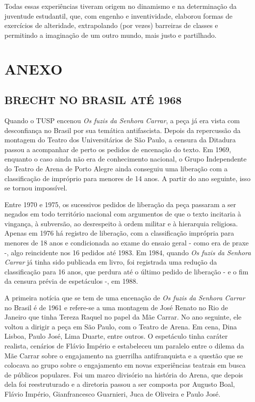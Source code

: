 Todas essas experiências tiveram origem no dinamismo e na determinação
da juventude estudantil, que, com engenho e inventividade, elaborou
formas de exercícios de alteridade, extrapolando (por vezes) barreiras
de classes e permitindo a imaginação de um outro mundo, mais justo e
partilhado.

\chapter{ANEXO}

\section{BRECHT NO BRASIL ATÉ 1968}

Quando o TUSP encenou \textit{Os fuzis da Senhora Carrar}, a peça já era
vista com desconfiança no Brasil por sua temática antifascista. Depois
da repercussão da montagem do Teatro dos Universitários de São Paulo, a
censura da Ditadura passou a acompanhar de perto os pedidos de encenação
do texto. Em 1969, enquanto o caso ainda não era de conhecimento
nacional, o Grupo Independente do Teatro de Arena de Porto Alegre ainda
conseguiu uma liberação com a classificação de impróprio para menores de
14 anos. A partir do ano seguinte, isso se tornou impossível.

Entre 1970 e 1975, os sucessivos pedidos de liberação da peça passaram a
ser negados em todo território nacional com argumentos de que o texto
incitaria à vingança, à subversão, ao desrespeito à ordem militar e à
hierarquia religiosa. Apenas em 1976 há registro de liberação, com a
classificação imprópria para menores de 18 anos e condicionada ao exame
do ensaio geral - como era de praxe -, algo reincidente nos 16 pedidos
até 1983. Em 1984, quando \textit{Os fuzis da Senhora Carrar} já tinha sido
publicada em livro, foi registrada uma redução da classificação para 16
anos, que perdura até o último pedido de liberação - e o fim da censura
prévia de espetáculos -, em 1988.

A primeira notícia que se tem de uma encenação de \textit{Os fuzis da
Senhora Carrar} no Brasil é de 1961 e refere-se a uma montagem de José
Renato no Rio de Janeiro que tinha Tereza Raquel no papel da Mãe Carrar.
No ano seguinte, ele voltou a dirigir a peça em São Paulo, com o Teatro
de Arena. Em cena, Dina Lisboa, Paulo José, Lima Duarte, entre outros. O
espetáculo tinha caráter realista, cenários de Flávio Império e
estabeleceu um paralelo entre o dilema da Mãe Carrar sobre o engajamento
na guerrilha antifranquista e a questão que se colocava ao grupo sobre o
engajamento em novas experiências teatrais em busca de públicos
populares. Foi um marco divisório na história do Arena, que depois dela
foi reestruturado e a diretoria passou a ser composta por Augusto Boal,
Flávio Império, Gianfrancesco Guarnieri, Juca de Oliveira e Paulo José.

